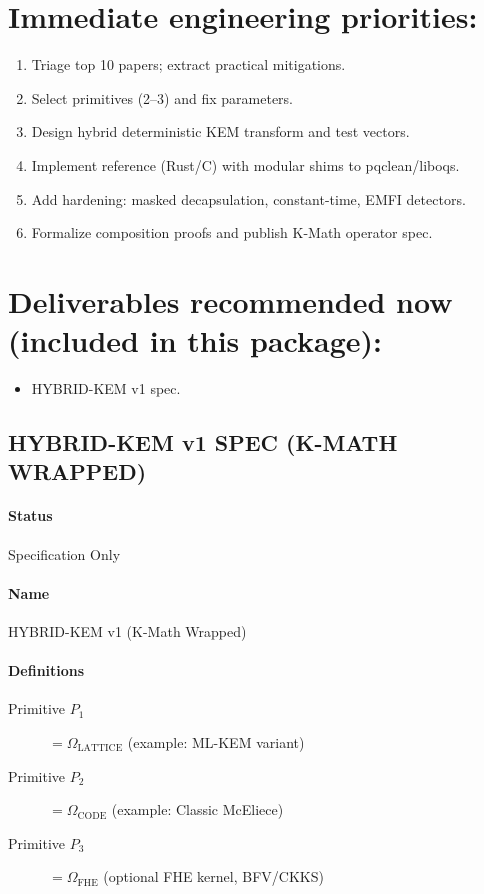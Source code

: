 \documentclass[11pt, a4paper]{article}
\begin{document}
\section*{Immediate engineering priorities:}
\begin{enumerate}
    \item Triage top 10 papers; extract practical mitigations.
    \item Select primitives (2--3) and fix parameters.
    \item Design hybrid deterministic KEM transform and test vectors.
    \item Implement reference (Rust/C) with modular shims to pqclean/liboqs.
    \item Add hardening: masked decapsulation, constant-time, EMFI detectors.
    \item Formalize composition proofs and publish K-Math operator spec.
\end{enumerate}

\section*{Deliverables recommended now (included in this package):}
\begin{itemize}
    \item HYBRID-KEM v1 spec.
\end{itemize}

\subsection*{HYBRID-KEM v1 SPEC (K-MATH WRAPPED)}

\paragraph{Status} Specification Only

\paragraph{Name} HYBRID-KEM v1 (K-Math Wrapped)

\paragraph{Definitions}
\begin{description}
    \item[Primitive $P_1$] $= \Omega_{\text{LATTICE}}$ (example: ML-KEM variant)
    \item[Primitive $P_2$] $= \Omega_{\text{CODE}}$ (example: Classic McEliece)
    \item[Primitive $P_3$] $= \Omega_{\text{FHE}}$ (optional FHE kernel, BFV/CKKS)
\end{description}
\end{document}
